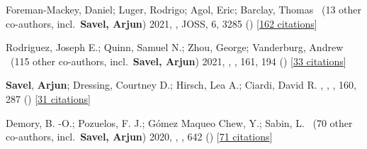 \item[{\color{numcolor}\scriptsize4}] Foreman-Mackey, Daniel; Luger, Rodrigo; Agol, Eric; Barclay, Thomas \etal\ ({13} other co-authors, incl.\ \textbf{Savel, Arjun}) 2021, , JOSS, {6}, 3285 () [\href{https://ui.adsabs.harvard.edu/abs/2021JOSS....6.3285F}{162 citations}]

\item[{\color{numcolor}\scriptsize3}] Rodriguez, Joseph E.; Quinn, Samuel N.; Zhou, George; Vanderburg, Andrew \etal\ ({115} other co-authors, incl.\ \textbf{Savel, Arjun}) 2021, , \aj, {161}, 194 () [\href{https://ui.adsabs.harvard.edu/abs/2021AJ....161..194R}{33 citations}]

\item[{\color{numcolor}\scriptsize2}] \textbf{Savel}, \textbf{Arjun}; Dressing, Courtney D.; Hirsch, Lea A.; Ciardi, David R. , , \aj, {160}, 287 () [\href{https://ui.adsabs.harvard.edu/abs/2020AJ....160..287S}{31 citations}]

\item[{\color{numcolor}\scriptsize1}] Demory, B. -O.; Pozuelos, F. J.; G{\'o}mez Maqueo Chew, Y.; Sabin, L. \etal\ ({70} other co-authors, incl.\ \textbf{Savel, Arjun}) 2020, , \aanda, {642} () [\href{https://ui.adsabs.harvard.edu/abs/2020A&A...642A..49D}{71 citations}]